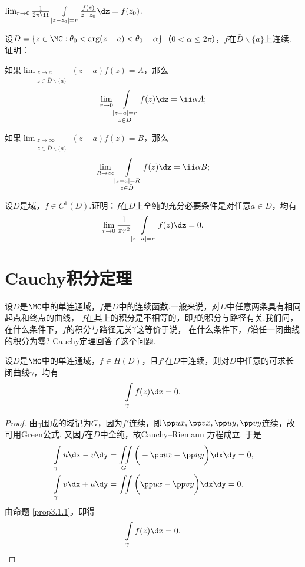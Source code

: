 \begin{xiti}
\begin{enuma}
    \item $\lim_{r\to0}\frac1{2\pi\ii}\int\limits_{|z-z_0|=r}\frac{f(z)}{z-z_0}\dz=f(z_0)$.
  \end{enuma}
\item 设$D=\{z\in\MC:\theta_0<\arg(z-a)<\theta_0+\alpha\}$（$0<\alpha\le2\pi$），$f$在$\bar D\backslash\{a\}$上连续. 证明：
\begin{enuma}
  \item 如果$\lim_{\substack{z\to a\\z\in\bar D\backslash\{a\}}}(z-a)f(z)=A$，那么
  \[\lim_{r\to0}\int\limits_{\substack{|z-a|=r\\z\in\bar D}}f(z)\dz=\ii\alpha A;\]
  \item 如果$\lim_{\substack{z\to \infty\\z\in\bar D\backslash\{a\}}}(z-a)f(z)=B$，那么
  \[\lim_{R\to\infty}\int\limits_{\substack{|z-a|=R\\z\in \bar D}}f(z)\dz=\ii\alpha B;\]
\end{enuma}
\item 设$D$是域，$f\in C^1(D)$.证明：$f$在$D$上全纯的充分必要条件是对任意$a\in D$，均有
\[\lim_{r\to0}\frac1{\pi r^2}\int\limits_{|z-a|=r}f(z)\dz=0.\]
\end{xiti}

\section{Cauchy积分定理\label{sec3.2}}
设$D$是$\MC$中的单连通域，$f$是$D$中的连续函数.一般来说，对$D$中任意两条具有相同起点和终点的曲线，
$f$在其上的积分是不相等的，即$f$的积分与路径有关.我们问，在什么条件下，$f$的积分与路径无关?这等价于说，
在什么条件下，$f$沿任一闭曲线的积分为零? Cauchy定理回答了这个问题.
\begin{theorem}\label{thm3.2.1}
设$D$是$\MC$中的单连通域，$f\in H(D)$，且$f'$在$D$中连续，则对$D$中任意的可求长闭曲线$\gamma$，均有
\[\int\limits_\gamma f(z)\dz=0.\]
\end{theorem}
\begin{proof}
由$\gamma$围成的域记为$G$，因为$f'$连续，即$\pp ux,\pp vx,\pp uy,\pp vy$连续，故可用Green公式.
又因$f$在$D$中全纯，故Cauchy--Riemann 方程成立. 于是
\begin{align*}
&\int\limits_\gamma u\dx-v\dy=\iint\limits_G\bigg(-\pp vx-\pp uy\bigg)\dx\dy=0,\\
&\int\limits_\gamma v\dx+u\dy=\iint\limits\bigg(\pp ux-\pp vy\bigg)\dx\dy=0.
\end{align*}
由命题 \ref{prop3.1.1}，即得
\begin{equation*}
  \int\limits_\gamma f(z)\dz=0. \qedhere
\end{equation*}
\end{proof}

